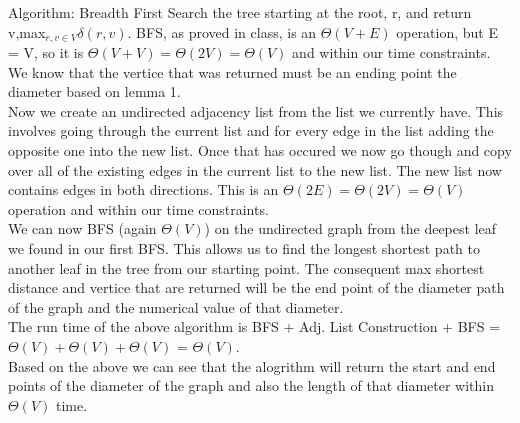 \documentclass[11pt]{article}
\begin{document}
\begin{enumerate}
Algorithm:
Breadth First Search the tree starting at the root, r, and return v,max$_{r,v\in V}\delta(r,v)$. BFS, as proved in class, is an $\Theta(V+E)$ operation, but E = V, so it is $\Theta(V+V) = \Theta(2V) = \Theta(V)$ and within our time constraints. We know that the vertice that was returned must be an ending point the diameter based on lemma 1.\\
Now we create an undirected adjacency list from the list we currently have. This involves going through the current list and for every edge in the list adding the opposite one into the new list. Once that has occured we now go though and copy over all of the existing edges in the current list to the new list. The new list now contains edges in both directions. This is an $\Theta(2E) = \Theta(2V) = \Theta(V)$ operation and within our time constraints.\\
We can now BFS (again $\Theta(V)$) on the undirected graph from the deepest leaf we found in our first BFS. This allows us to find the longest shortest path to another leaf in the tree from our starting point.
The consequent max shortest distance and vertice that are returned will be the end point of the diameter path of the graph and the numerical value of that diameter.\\

The run time of the above algorithm is BFS + Adj. List Construction + BFS = $\Theta(V) + \Theta(V) + \Theta(V)$ = $\Theta(V)$.\\

Based on the above we can see that the alogrithm will return the start and end points of the diameter of the graph and also the length of that diameter within $\Theta(V)$ time.

\end{enumerate}
\end{document}
